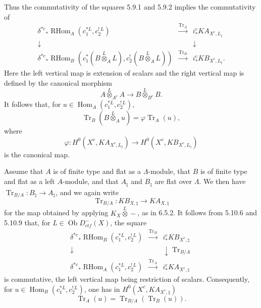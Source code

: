 \documentclass[11pt]{article}
\theoremstyle{plain}
\theoremstyle{definition}
\theoremstyle{remark}
\DeclareMathOperator{\Hom}{Hom}
\DeclareMathOperator{\ob}{Ob}
\DeclareMathOperator{\Tr}{Tr}
\DeclareMathOperator{\RHom}{RHom}
\begin{document}
Thus the commutativity of the squares 5.9.1 and 5.9.2 implies the commutativity of
\begin{equation}\tag{6.7.1}
\begin{array}{ccc}
\delta^{*c}{}_*\RHom_A(c_1^{*L},c_2^{!\,L}) & \xrightarrow{\Tr_A} & i_*^c K A_{X^c,L_\natural} \\[6pt]
\downarrow & & \downarrow \\[6pt]
\delta^{*c}{}_*\RHom_B(c_1^*(B\overset{L}{\otimes}_A L),c_2^{!}(B\overset{L}{\otimes}_A L)) & \xrightarrow{\Tr_B} & i_*^c K B_{X^c,L_\natural} .
\end{array}
\end{equation}
Here the left vertical map is extension of scalars and the right vertical map is
defined by the canonical morphism
\[
      A\overset{L}{\otimes}_{A^e}A\longrightarrow
      B\overset{L}{\otimes}_{B^e}B.
\]
It follows that, for $u\in\Hom_A(c_1^{*L},c_2^{!\,L})$,
\begin{equation}\tag{6.7.2}
      \Tr_B(B\overset{L}{\otimes}_A u)=\varphi\Tr_A(u),
\end{equation}
where
\[
  \varphi:H^0(X^c,K A_{X^c,L_\natural})\longrightarrow
  H^0(X^c,K B_{X^c,L_\natural})
\]
is the canonical map.

Assume that $A$ is of finite type and flat as a $\Lambda$-module, that $B$ is of
finite type and flat as a left $A$-module, and that $A_\natural$ and $B_\natural$ are
flat over $\Lambda$. We then have $\Tr_{B/A}:B_\natural\to A_\natural$, and we again
write
\begin{equation}\tag{6.7.3}
     \Tr_{B/A}:K B_{X,\natural}\longrightarrow K A_{X,\natural}
\end{equation}
for the map obtained by applying $K_X\overset{L}{\otimes}-$, as in 6.5.2. It follows
from 5.10.6 and 5.10.9 that, for $L\in\ob D_{ctf}^{-}(X)$, the square
\begin{equation}\tag{6.7.4}
\begin{array}{ccc}
\delta^{*c}{}_*\RHom_B(c_1^{*L},c_2^{!\,L}) & \xrightarrow{\Tr_B} & i_*^c K B_{X^c,\natural} \\[6pt]
\downarrow & & \downarrow\scriptstyle \Tr_{B/A} \\[6pt]
\delta^{*c}{}_*\RHom_A(c_1^{*L},c_2^{!\,L}) & \xrightarrow{\Tr_A} & i_*^c K A_{X^c,\natural}
\end{array}
\end{equation}
is commutative, the left vertical map being restriction of scalars. Consequently, for
$u\in\Hom_B(c_1^{*L},c_2^{!\,L})$, one has in
$H^0(X^c,K A_{X^c,\natural})$
\begin{equation}\tag{6.7.5}
      \Tr_A(u)=\Tr_{B/A}(\Tr_B(u)).
\end{equation}
\end{document}
